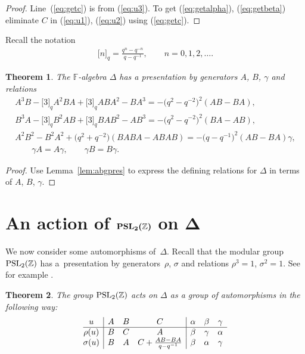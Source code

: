 \documentclass[11pt]{article}
\numberwithin{equation}{section}
\newtheorem{Theorem}{Theorem}[section]
\begin{document}
\begin{proof}\sloppy
Line~(\ref{eq:getc})
is from (\ref{eq:u3}).
To get
(\ref{eq:getalpha}),
(\ref{eq:getbeta})
eliminate $C$ in
(\ref{eq:u1}),
(\ref{eq:u2})
using
(\ref{eq:getc}).
\end{proof}

 Recall the notation
\begin{gather*}
\lbrack n \rbrack_q= \frac{q^n-q^{-n}}{q-q^{-1}}, \qquad
n=0,1,2,\ldots.
\end{gather*}




{\samepage

\begin{Theorem}
\label{prop:altpres}
The $\mathbb F$-algebra $\Delta $ has a  presentation by generators
$A$, $B$, $\gamma$ and
relations
 \begin{gather*}
 A^3B-\lbrack 3\rbrack_q A^2BA+\lbrack 3\rbrack_q ABA^2-BA^3
= -\big(q^2-q^{-2}\big)^2(AB-BA),
\\
 B^3A-\lbrack 3\rbrack_q B^2AB+\lbrack 3\rbrack_q BAB^2-AB^3
= -\big(q^2-q^{-2}\big)^2(BA-AB),
\\
 A^2B^2-B^2A^2+\big(q^2+q^{-2}\big)(BABA-ABAB) = -\big(q-q^{-1}\big)^2(AB-BA)\gamma,
\\
  \qquad \gamma A = A \gamma,   \qquad \gamma B=B \gamma.
 \end{gather*}
\end{Theorem}

\begin{proof}
Use Lemma~\ref{lem:abgpres} to
express the def\/ining relations
for $\Delta $ in terms of $A$, $B$, $\gamma$.
\end{proof}}
\setcounter{section}{2}
\setcounter{subsection}{0}
\setcounter{subsubsection}{0}
\setcounter{Theorem}{3}
\setcounter{equation}{3}
\section[An action of ${\rm  {PSL}}_2(\mathbb Z)$ on $\Delta$]{An action of $\boldsymbol{{\rm  {PSL}}_2(\mathbb Z)}$ on $\boldsymbol{\Delta}$}

We now consider
some automorphisms of~$\Delta $.
Recall that the modular group
${\rm  {PSL}}_2(\mathbb Z)$ has a~presentation
by generators~$\rho$, $\sigma$ and
relations $\rho^3=1$, $\sigma^2=1$.
See for example \cite{alpern}.


\begin{Theorem}
\label{thm:try}
The group
${\rm  {PSL}}_2(\mathbb Z)$ acts on
$\Delta $ as a group of automorphisms in the following way:
\[
\begin{array}{@{}c| ccc | c c c}
u &  A & B  & C
&  \alpha & \beta  & \gamma
\\
\hline
\rho(u) &  B & C & A
&  \beta  & \gamma & \alpha
\\
\sigma(u) &  B & A & C+\frac{AB-BA}{q-q^{-1}}
&  \beta & \alpha & \gamma
\end{array}
\]
\end{Theorem}
\end{document}
